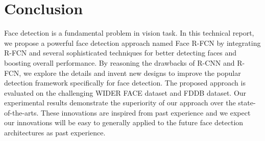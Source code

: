 \documentclass{article} \usepackage{nips13submit_e,times}
\begin{document}
\section{Conclusion}

Face detection is a fundamental problem in vision task.  
In this technical report, we propose a powerful face detection approach named Face R-FCN by integrating R-FCN and several sophisticated techniques for better detecting faces and boosting overall performance. By reasoning the drawbacks of R-CNN and R-FCN, we explore the details and invent new designs to improve the popular detection framework specifically for face detection. The proposed approach is evaluated on the challenging WIDER FACE dataset and FDDB dataset. Our experimental results demonstrate the superiority of our approach over the state-of-the-arts. These innovations are inspired from past experience and we expect our innovations will be easy to generally applied to the future face detection architectures as past experience. 




{\small


}
\end{document}
